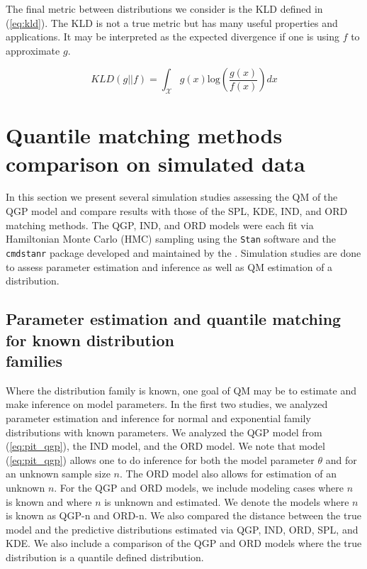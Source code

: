 \documentclass[preprint,12pt,authoryear]{elsarticle}
\begin{document}
The final metric between distributions we consider is the KLD defined in (\ref{eq:kld}). The KLD is not a true metric but has many useful properties and applications. It may be interpreted as the expected divergence if one is using $f$ to approximate $g$. 


\begin{equation}
    \label{eq:kld}
    KLD(g || f) = \int_{\mathcal{X}} g(x) \text{log} \left( \frac{g(x)}{f(x)} \right) dx
\end{equation}



\section{Quantile matching methods comparison on simulated data} \label{sec:simulation_analyses}

In this section we present several simulation studies assessing the QM of the QGP model and compare results with those of the SPL, KDE, IND, and ORD matching methods. The QGP, IND, and ORD models were each fit via Hamiltonian Monte Carlo (HMC) sampling using the \texttt{Stan} software and the \texttt{cmdstanr} package developed and maintained by the \cite{stan2024manual} \cite[]{gabry2022stan}. Simulation studies are done to assess parameter estimation and inference as well as QM estimation of a distribution.



\subsection{Parameter estimation and quantile matching for known distribution \\families} 

Where the distribution family is known, one goal of QM may be to estimate and make inference on model parameters. In the first two studies, we analyzed parameter estimation and inference for normal and exponential family distributions with known parameters. We analyzed the QGP model from (\ref{eq:pit_qgp}), the IND model, and the ORD model. We note that model (\ref{eq:pit_qgp}) allows one to do inference for both the model parameter $\theta$ and for an unknown sample size $n$. The ORD model also allows for estimation of an unknown $n$. For the QGP and ORD models, we include modeling cases where $n$ is known and where $n$ is unknown and estimated. We denote the models where $n$ is known as QGP-n and ORD-n. We also compared the distance between the true model and the predictive distributions estimated via QGP, IND, ORD, SPL, and KDE. We also include a comparison of the QGP and ORD models where the true distribution is a quantile defined distribution.
\end{document}

